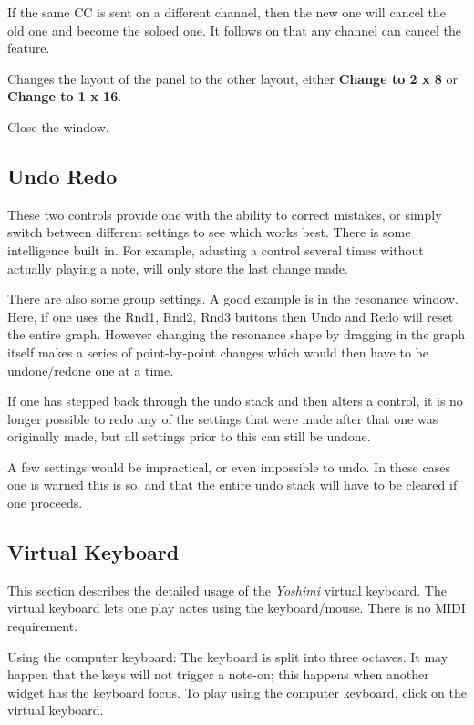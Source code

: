    If the same CC is sent on a different channel, then the new one will cancel the
   old one and become the soloed one. It follows on that any channel can cancel the
   feature.

   Changes the layout of the panel to the other layout, either
   \textbf{Change to 2 x 8} or
   \textbf{Change to 1 x 16}.

   Close the window.

\subsection{Undo Redo}
\label{subsec:undo_redo}
   These two controls provide one with the ability to correct mistakes, or simply
   switch between different settings to see which works best.
   There is some intelligence built in. For example, adusting a control several
   times without actually playing a note, will only store the last change made.

   There are also some group settings. A good example is in the resonance window.
   Here, if one uses the Rnd1, Rnd2, Rnd3 buttons then Undo and Redo will reset
   the entire graph. However changing the resonance shape by dragging in the graph
   itself makes a series of point-by-point changes which would then have to be
   undone/redone one at a time.

   If one has stepped back through the undo stack and then alters a control, it is
   no longer possible to redo any of the settings that were made after that one
   was originally made, but all settings prior to this can still be undone.

   A few settings would be impractical, or even impossible to undo. In these
   cases one is warned this is so, and that the entire undo stack will have to
   be cleared if one proceeds.

\subsection{Virtual Keyboard}
\label{subsec:virtual_keyboard}

   This section describes the detailed usage of the
   \textsl{Yoshimi} virtual keyboard.
   The virtual keyboard lets one play notes using the keyboard/mouse. There is
   no MIDI requirement.

   Using the computer keyboard: The keyboard is split into three octaves.
   It may happen that the keys will not trigger a note-on;
   this happens when another widget has the keyboard focus.
   To play using the computer keyboard, click on the virtual keyboard.

